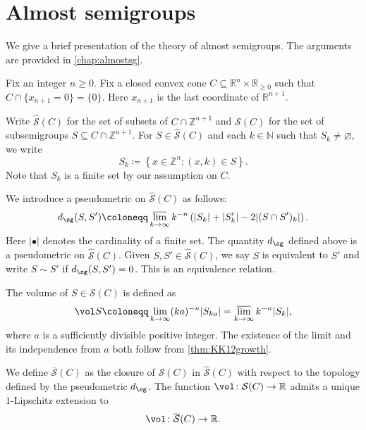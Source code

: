 \section{Almost semigroups}\label{sec:clo1}
We give a brief presentation of the theory of almost semigroups. The arguments are provided in \cref{chap:almostsg}.

Fix an integer $n\geq 0$. Fix a closed convex cone $C\subseteq \mathbb{R}^{n}\times \mathbb{R}_{\geq 0}$ such that $C\cap \{x_{n+1}=0\}=\{0\}$. Here $x_{n+1}$ is the last coordinate of $\mathbb{R}^{n+1}$.

Write $\hat{\mathcal{S}}(C)$ for the set of subsets of $C\cap \mathbb{Z}^{n+1}$ and $\mathcal{S}(C)$ for the set of subsemigroups $S\subseteq C\cap \mathbb{Z}^{n+1}$. For $S\in \hat{\mathcal{S}}(C)$ and each $k\in \mathbb{N}$ such that $S_k\neq\varnothing$, we write
\[
S_k\coloneqq \left\{x\in \mathbb{Z}^n: (x,k)\in S \right\}.
\]
Note that $S_k$ is a finite set by our assumption on $C$.

We introduce a pseudometric on $\hat{\mathcal{S}}(C)$ as follows:
\begin{equation}\label{eq:dsgdef}
d_{\sg}(S,S')\coloneqq \varlimsup_{k\to\infty} k^{-n} \left(|S_k|+|S'_k|-2|(S\cap S')_k|\right).
\end{equation}
Here $|\bullet|$ denotes the cardinality of a finite set. The quantity $d_{\sg}$ defined above is a pseudometric on $\hat{\mathcal{S}}(C)$.
Given $S,S'\in \hat{\mathcal{S}}(C)$, we say $S$ is equivalent to $S'$ and write $S\sim S'$ if $d_{\sg}(S,S')=0$. This is an equivalence relation.

The volume of $S\in \mathcal{S}(C)$ is defined as
\[
\vol S\coloneqq \lim_{k\to\infty} (ka)^{-n}|S_{ka}|=\varlimsup_{k\to\infty} k^{-n}|S_k|,
\]
where $a$ is a sufficiently divisible positive integer.
The existence of the limit and its independence from $a$ both follow from \cref{thm:KK12growth}.

We define $\overline{\mathcal{S}}(C)$ as the closure of $\mathcal{S}(C)$ in $\hat{\mathcal{S}}(C)$ with respect to the topology defined by the pseudometric $d_{\sg}$.
The function $\vol\colon \mathcal{S}(C)\rightarrow \mathbb{R}$ admits a unique $1$-Lipschitz extension to
\begin{equation}\label{eq:volex}
\vol\colon \overline{\mathcal{S}}(C)\rightarrow \mathbb{R}.
\end{equation}

